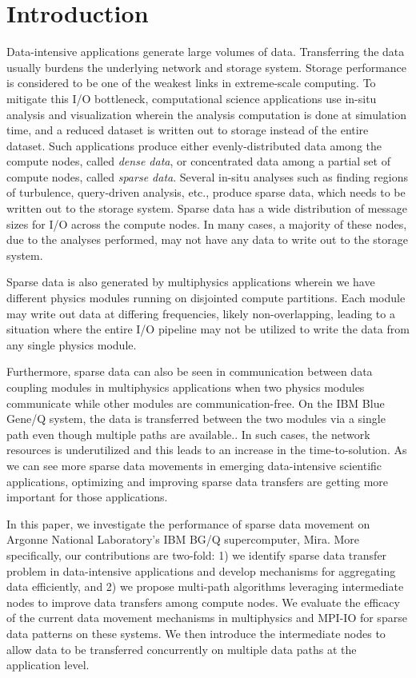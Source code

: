 \section{Introduction}

Data-intensive applications generate large volumes of data. Transferring the data usually burdens the underlying network and storage system. Storage performance is considered to be one of the weakest links in extreme-scale computing. To mitigate this I/O bottleneck, computational science applications use in-situ analysis and visualization wherein the analysis computation is done at simulation time, and a reduced dataset is written out to storage instead of the entire dataset. Such applications produce either evenly-distributed data among the compute nodes, called {\em dense data}, or concentrated data among a partial set of compute nodes, called {\em sparse data}. Several in-situ analyses such as finding regions of turbulence, query-driven analysis, etc., produce sparse data, which needs to be written out to the storage system. Sparse data has a wide distribution of message sizes for I/O across the compute nodes. In many cases, a majority of these nodes, due to the analyses performed, may not have any data to write out to the storage system.

Sparse data is also generated by multiphysics applications wherein we have different physics modules running on disjointed compute partitions. Each module may write out data at differing frequencies, likely non-overlapping, leading to a situation where the entire I/O pipeline may not be utilized to write the data from any single physics module.

Furthermore, sparse data can also be seen in communication between data coupling modules in multiphysics applications when two physics modules communicate while other modules are communication-free. On the IBM Blue Gene/Q system, the data is transferred between the two modules via a single path even though multiple paths are available.. In such cases, the network resources is underutilized and this leads to an increase in the time-to-solution. As we can see more sparse data movements in emerging data-intensive scientific applications, optimizing and improving sparse data transfers are getting more important for those applications.

In this paper, we investigate the performance of sparse data movement on Argonne National Laboratory's IBM BG/Q supercomputer, Mira. More specifically, our contributions are two-fold: 1) we identify sparse data transfer problem in data-intensive applications and develop mechanisms for aggregating data efficiently, and 2) we propose multi-path algorithms leveraging intermediate nodes to improve data transfers among compute nodes. We evaluate the efficacy of the current data movement mechanisms in multiphysics and MPI-IO for sparse data patterns on these systems. We then introduce the intermediate nodes to allow data to be transferred concurrently on multiple data paths at the application level.


